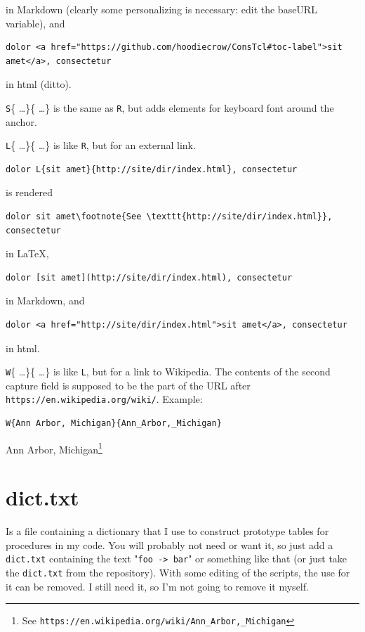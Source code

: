 \documentclass{report}
\begin{document}
in Markdown (clearly some personalizing is necessary: edit the baseURL variable), and

\begin{verbatim}
dolor <a href="https://github.com/hoodiecrow/ConsTcl#toc-label">sit amet</a>, consectetur
\end{verbatim}

in html (ditto).

\texttt{S}\{ \ldots  \}\{ \ldots  \} is the same as \texttt{R}, but adds elements for keyboard font around the anchor.

\texttt{L}\{ \ldots  \}\{ \ldots  \} is like \texttt{R}, but for an external link.

\begin{verbatim}
dolor L{sit amet}{http://site/dir/index.html}, consectetur
\end{verbatim}

is rendered

\begin{verbatim}
dolor sit amet\footnote{See \texttt{http://site/dir/index.html}}, consectetur
\end{verbatim}

in \LaTeX{},

\begin{verbatim}
dolor [sit amet](http://site/dir/index.html), consectetur
\end{verbatim}

in Markdown, and

\begin{verbatim}
dolor <a href="http://site/dir/index.html">sit amet</a>, consectetur
\end{verbatim}

in html.

\texttt{W}\{ \ldots  \}\{ \ldots  \} is like \texttt{L}, but for a link to Wikipedia. The contents of the second capture field is supposed to be the part of the URL after \texttt{https://en.wikipedia.org/wiki/}. Example:

\begin{verbatim}
W{Ann Arbor, Michigan}{Ann_Arbor,_Michigan}
\end{verbatim}

Ann Arbor, Michigan\footnote{See \texttt{https://en.wikipedia.org/wiki/Ann\_Arbor,\_Michigan}}

\chapter{dict.txt}
\label{dicttxt}

Is a file containing a dictionary that I use to construct prototype tables for procedures in my code. You will probably not need or want it, so just add a \texttt{dict.txt} containing the text "\texttt{foo -> bar}" or something like that (or just take the \texttt{dict.txt} from the repository). With some editing of the scripts, the use for it can be removed. I still need it, so I'm not going to remove it myself.
\end{document}
